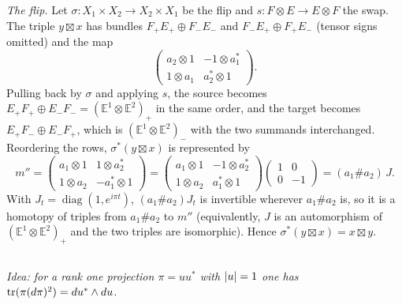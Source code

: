 \emph{The flip.} Let $\sigma:X_1\times X_2\to X_2\times X_1$ be the flip and
$s:F\otimes E\to E\otimes F$ the swap. The triple $y\boxtimes x$ has bundles
$F_+E_+\oplus F_-E_-$ and $F_-E_+\oplus F_+E_-$ (tensor signs omitted) and the map
\begin{equation*}
\begin{pmatrix}a_2\otimes1&-1\otimes a_1^*\\1\otimes a_1&a_2^*\otimes1\end{pmatrix}.
\end{equation*}
Pulling back by $\sigma$ and applying $s$, the source becomes $E_+F_+\oplus
E_-F_-=(\mathbb E^1\otimes\mathbb E^2)_+$ in the same order, and the target becomes
$E_+F_-\oplus E_-F_+$, which is $(\mathbb E^1\otimes\mathbb E^2)_-$ with the two
summands interchanged. Reordering the rows, $\sigma^*(y\boxtimes x)$ is represented by
\begin{equation*}
m''=\begin{pmatrix}a_1\otimes1&1\otimes a_2^*\\1\otimes a_2&-a_1^*\otimes1\end{pmatrix}
=\begin{pmatrix}a_1\otimes1&-1\otimes a_2^*\\1\otimes a_2&a_1^*\otimes1\end{pmatrix}
\begin{pmatrix}1&0\\0&-1\end{pmatrix}=(a_1\#a_2)\,J .
\end{equation*}
With $J_t=\operatorname{diag}(1,e^{i\pi t})$, $(a_1\#a_2)J_t$ is invertible wherever
$a_1\#a_2$ is, so it is a homotopy of triples from $a_1\#a_2$ to $m''$ (equivalently,
$J$ is an automorphism of $(\mathbb E^1\otimes\mathbb E^2)_+$ and the two triples are
isomorphic). Hence $\sigma^*(y\boxtimes x)=x\boxtimes y$.

\subsection*{}
\emph{Idea: for a rank one projection $\pi=uu^*$ with $\lvert u\rvert=1$ one has
$\operatorname{tr}(\pi(d\pi)^2)=du^*\wedge du$.}

